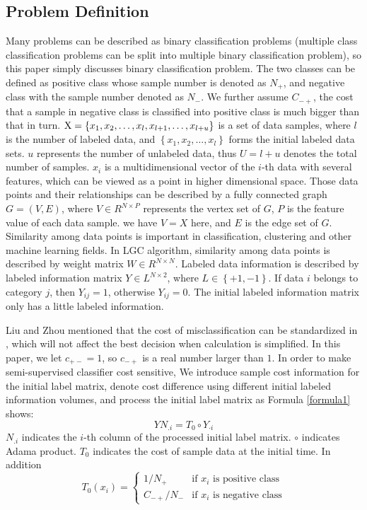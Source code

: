 \documentclass{svjour3}                     %
\begin{document}
\subsection{Problem Definition}
Many problems can be described as binary classification problems (multiple class classification problems can be split into multiple binary classification problem), so this paper simply discusses binary classification problem. The two classes can be defined as positive class whose sample number is denoted as ${N_ + }$, and negative class with the sample number denoted as ${N_ - }$. We further assume $C_{-+}$, the cost that a sample in negative class is classified into positive class is much bigger than that in turn. ${\rm{X}} = \left\{ {{x_1},{x_2}, \ldots ,{x_l},{x_{l + 1}}, \ldots ,{x_{l + u}}} \right\}$ is a set of data samples, where $l$ is the number of labeled data, and $\left\{ {{x_1},{x_2}, \ldots ,{x_l}} \right\}$ forms the initial labeled data sets. $u$ represents the number of unlabeled data, thus $U=l+u$ denotes the total number of samples. ${x_i}$ is a multidimensional vector of the $i$-th data with several features, which can be viewed as a point in higher dimensional space. Those data points and their relationships can be described by a fully connected graph $G = \left( {V,E} \right)$, where $V \in {R^{N \times P}}$ represents the vertex set of $G$, $P$ is the feature value of each data sample. we have $V = X$ here, and $E$ is the edge set of $G$. Similarity among data points is important in classification, clustering and other machine learning fields. In LGC algorithm, similarity among data points is described by weight matrix $W \in {R^{N \times N}}$. Labeled data information is described by labeled information matrix $Y \in {L^{N \times 2}}$, where $L \in \left\{ { + 1, - 1} \right\}$. If data $i$ belongs to category $j$, then ${Y_{ij}} = 1$, otherwise ${Y_{ij}} = 0$. The initial labeled information matrix only has a little labeled information.

Liu and Zhou mentioned that the cost of misclassification can be standardized in \cite{liu2006influence}, which will not affect the best decision when calculation is simplified. In this paper, we let ${c_{ +  - }} = 1$, so  ${c_{ - + }}$ is a real number larger than $1$. In order to make semi-supervised classifier cost sensitive, We introduce sample cost information for the initial label matrix, denote cost difference using different initial labeled information volumes, and process the initial label matrix as Formula \ref{formula1} shows:
\begin{equation} \label{formula1}
YN_{.i} = {T_0} \circ {Y_{ \cdot i}} 
\end{equation}
${N_{.i}}$ indicates the $i$-th column of the processed initial label matrix. $\circ $ indicates Adama product. $T_0$ indicates the cost of sample data at the initial time. In addition
\begin{equation}
{T_0}({x_i})=
  \begin{cases}
  1/{N_ +}& \mbox{if } x_i \mbox{ is positive class} \\
  {C_{-+}}/{N_ - } & \mbox{if } x_i \mbox{ is negative class}  
  \end{cases}
\end{equation}
\end{document}
